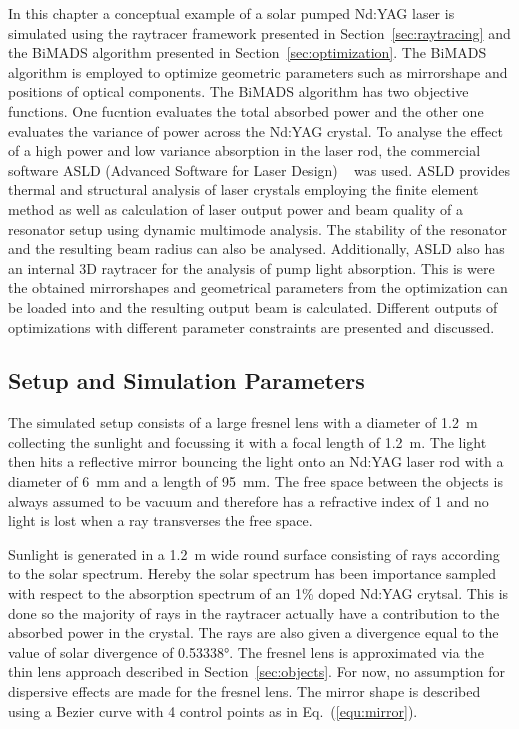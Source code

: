 \documentclass[a4paper,10pt]{article}
\newcommand{\equref}[1]{Eq.~(\ref{#1})}
\newcommand{\secref}[1]{Section~\ref{#1}}
\begin{document}
    In this chapter a conceptual example of a solar pumped Nd:YAG laser is
    simulated using the raytracer framework presented in \secref{sec:raytracing}
    and the BiMADS algorithm presented in \secref{sec:optimization}.
    The BiMADS algorithm is employed to optimize geometric parameters such
    as mirrorshape and positions of optical components.
    The BiMADS algorithm has two objective functions.
    One fucntion evaluates the total absorbed power and the other one
    evaluates the variance of power across the Nd:YAG crystal.
    To analyse the effect of a high power and low variance absorption
    in the laser rod, the commercial software ASLD (Advanced Software
    for Laser Design) ~\cite{asld_website} was used.
    ASLD provides thermal and structural analysis of laser crystals
    employing the finite element method as well as
    calculation of laser output power and beam quality of a resonator setup
    using dynamic multimode analysis.
    The stability of the resonator and the resulting beam radius
    can also be analysed. 
    Additionally, ASLD also has an internal 3D raytracer for the analysis
    of pump light absorption.
    This is were the obtained mirrorshapes and geometrical parameters
    from the optimization can be loaded into and the resulting output
    beam is calculated.
    Different outputs of optimizations with different parameter constraints
    are presented and discussed.

    \subsection{Setup and Simulation Parameters}
    
    The simulated setup consists of a large fresnel lens with a 
    diameter of \SI{1.2}{m}
    collecting the sunlight and focussing it with a focal length of \SI{1.2}{m}.
    The light then hits a reflective mirror bouncing the light onto an Nd:YAG
    laser rod with a diameter of \SI{6}{mm} and a length of \SI{95}{mm}.
    The free space between the objects is always assumed to be vacuum and
    therefore has a refractive index of 1 and no light is lost when a 
    ray transverses the free space.

    Sunlight is generated in a \SI{1.2}{m} wide round surface consisting of
    rays according to the solar spectrum.
    Hereby the solar spectrum has been importance sampled with
    respect to the absorption spectrum of an 1\% doped Nd:YAG crytsal.
    This is done so the majority of rays in the raytracer actually
    have a contribution to the absorbed power in the crystal.
    The rays are also given a divergence equal to the value of solar divergence
    of \ang{0.53338}.
    The fresnel lens is approximated via the thin lens approach described
    in \secref{sec:objects}.
    For now, no assumption for dispersive effects are made for the
    fresnel lens.
    The mirror shape is described using a Bezier curve with 4 control
    points as in \equref{equ:mirror}.
\end{document}
